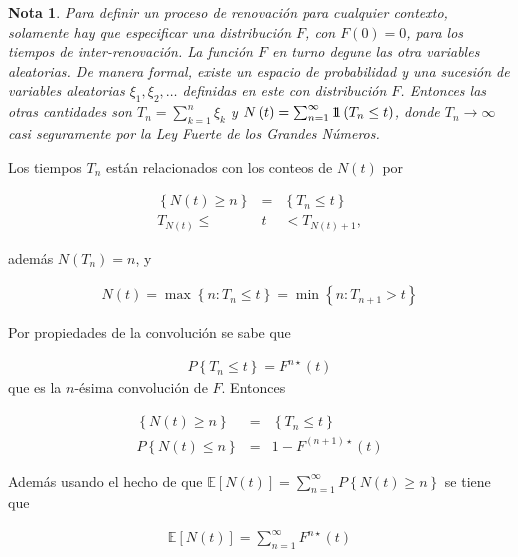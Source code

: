 \documentclass{article}
\newtheorem{Note}{Nota}
\newcommand{\esp}{\mathbb{E}}
\newcommand{\indora}{\mbox{$1$\hspace{-0.8ex}$1$}}
\begin{document}
\begin{Note}
Para definir un proceso de renovaci\'on para cualquier contexto, solamente hay que especificar una distribuci\'on $F$, con $F\left(0\right)=0$, para los tiempos de inter-renovaci\'on. La funci\'on $F$ en turno degune las otra variables aleatorias. De manera formal, existe un espacio de probabilidad y una sucesi\'on de variables aleatorias $\xi_{1},\xi_{2},\ldots$ definidas en este con distribuci\'on $F$. Entonces las otras cantidades son $T_{n}=\sum_{k=1}^{n}\xi_{k}$ y $N\left(t\right)=\sum_{n=1}^{\infty}\indora\left(T_{n}\leq t\right)$, donde $T_{n}\rightarrow\infty$ casi seguramente por la Ley Fuerte de los Grandes N\'umeros.
\end{Note}


Los tiempos $T_{n}$ est\'an relacionados con los conteos de $N\left(t\right)$ por

\begin{eqnarray*}
\left\{N\left(t\right)\geq n\right\}&=&\left\{T_{n}\leq t\right\}\\
T_{N\left(t\right)}\leq &t&<T_{N\left(t\right)+1},
\end{eqnarray*}

adem\'as $N\left(T_{n}\right)=n$, y 

\begin{eqnarray*}
N\left(t\right)=\max\left\{n:T_{n}\leq t\right\}=\min\left\{n:T_{n+1}>t\right\}
\end{eqnarray*}

Por propiedades de la convoluci\'on se sabe que

\begin{eqnarray*}
P\left\{T_{n}\leq t\right\}=F^{n\star}\left(t\right)
\end{eqnarray*}
que es la $n$-\'esima convoluci\'on de $F$. Entonces 

\begin{eqnarray*}
\left\{N\left(t\right)\geq n\right\}&=&\left\{T_{n}\leq t\right\}\\
P\left\{N\left(t\right)\leq n\right\}&=&1-F^{\left(n+1\right)\star}\left(t\right)
\end{eqnarray*}

Adem\'as usando el hecho de que $\esp\left[N\left(t\right)\right]=\sum_{n=1}^{\infty}P\left\{N\left(t\right)\geq n\right\}$
se tiene que

\begin{eqnarray*}
\esp\left[N\left(t\right)\right]=\sum_{n=1}^{\infty}F^{n\star}\left(t\right)
\end{eqnarray*}
\end{document}
